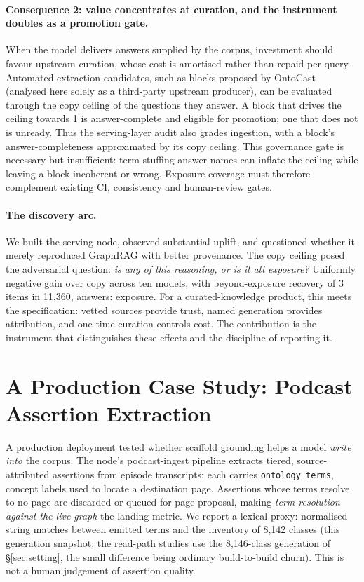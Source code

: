 \documentclass[10pt,twocolumn]{article}
\begin{document}
\paragraph{Consequence 2: value concentrates at curation, and the instrument doubles as a promotion
gate.} When the model delivers answers supplied by the corpus, investment should favour upstream curation, whose cost is amortised rather than repaid per query. Automated extraction candidates, such as blocks proposed by OntoCast~\cite{ontocast} (analysed here solely as a third-party upstream producer), can be evaluated through the copy ceiling of the questions they answer. A block that drives the ceiling towards 1 is answer-complete and eligible for promotion; one that does not is unready. Thus the serving-layer audit also grades ingestion, with a block's answer-completeness approximated by its copy ceiling. This governance gate is necessary but insufficient: term-stuffing answer names can inflate the ceiling while leaving a block incoherent or wrong. Exposure coverage must therefore complement existing CI, consistency and human-review gates.

\paragraph{The discovery arc.} We built the serving node, observed substantial uplift, and questioned whether it merely reproduced GraphRAG with better provenance. The copy ceiling posed the adversarial question: \emph{is any of this reasoning, or is it all exposure?} Uniformly negative gain over copy across ten models, with beyond-exposure recovery of 3 items in 11{,}360, answers: exposure. For a curated-knowledge product, this meets the specification: vetted sources provide trust, named generation provides attribution, and one-time curation controls cost. The contribution is the instrument that distinguishes these effects and the discipline of reporting it.


\section{A Production Case Study: Podcast Assertion Extraction}\label{sec:casestudy}
A production deployment tested whether scaffold grounding helps a model \emph{write into} the
corpus. The node's podcast-ingest pipeline extracts tiered, source-attributed assertions from
episode transcripts; each carries \texttt{ontology\_terms}, concept labels used to locate a
destination page. Assertions whose terms resolve to no page are discarded or queued for page
proposal, making \emph{term resolution against the live graph} the landing metric. We report a
lexical proxy: normalised string matches between emitted terms and the inventory of 8{,}142
classes (this generation snapshot; the read-path studies use the 8{,}146-class generation of
\S\ref{sec:setting}, the small difference being ordinary build-to-build churn). This is not a
human judgement of assertion quality.
\end{document}
